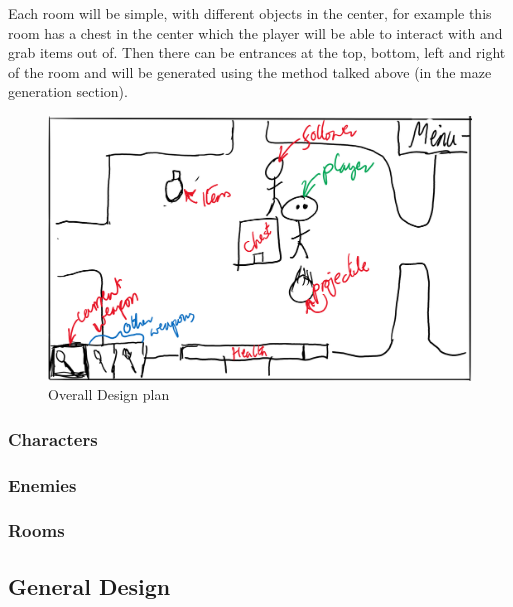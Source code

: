 \documentclass{article}
\begin{document}
                Each room will be simple, with different objects in the center, for example this room has a chest in the center which the player will be able to interact with and grab items out of. Then there can be entrances at the top, bottom, left and right of the room and will be generated using the method talked above (in the maze generation section).
                \begin{figure}[hbt!]
                    \centerline{\includegraphics[scale=0.3]{img/Design/Overall Design.png}}
                    \caption{Overall Design plan}
                    \label{fig}
                \end{figure}
            \subsubsection{Characters} %
            \subsubsection{Enemies}
            \subsubsection{Rooms}

        \subsection{General Design}
\end{document}
